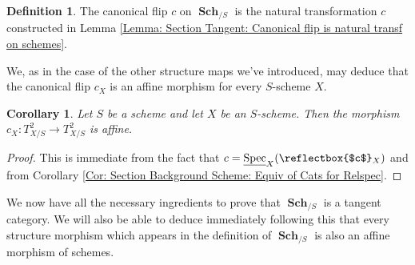 \documentclass{amsart}
\newtheorem{lemma}[equation]{Lemma}
\newtheorem{corollary}[equation]{Corollary}
\theoremstyle{definition}
\newtheorem{definition}[equation]{Definition}
\DeclareMathOperator{\Spec}{Spec}
\newcommand{\RelSpec}[1]{\underline{\Spec}_{#1}}
\DeclareMathOperator{\Sch}{\mathbf{Sch}}
\numberwithin{equation}{subsection}
\begin{document}
\begin{definition}\label{Defn: Section Tangent: Canonical Flip}
The canonical flip $c$ on $\Sch_{/S}$ is the natural transformation $c$ constructed in Lemma \ref{Lemma: Section Tangent: Canonical flip is natural transf on schemes}.
\end{definition}
We, as in the case of the other structure maps we've introduced, may deduce that the canonical flip $c_X$ is an affine morphism for every $S$-scheme $X$.
\begin{corollary}\label{Cor: Section Tangent: Canonical flip is affine}
Let $S$ be a scheme and let $X$ be an $S$-scheme. Then the morphism $c_X:T^{2}_{X/S} \to T^{2}_{X/S}$ is affine.
\end{corollary}
\begin{proof}
This is immediate from the fact that $c = \RelSpec{X}(\reflectbox{$c$}_X)$ and from Corollary \ref{Cor: Section Background Scheme: Equiv of Cats for Relspec}.
\end{proof}

We now have all the necessary ingredients to prove that $\Sch_{/S}$ is a tangent category. We will also be able to deduce immediately following this that every structure morphism which appears in the definition of $\Sch_{/S}$ is also an affine morphism of schemes.


\end{document}
